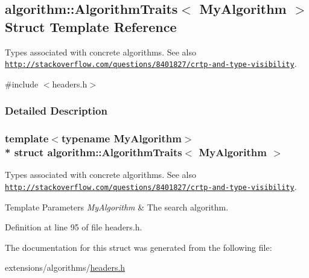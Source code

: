 \hypertarget{classalgorithm_1_1AlgorithmTraits}{}\subsection{algorithm\+:\+:Algorithm\+Traits$<$ My\+Algorithm $>$ Struct Template Reference}
\label{classalgorithm_1_1AlgorithmTraits}


Types associated with concrete algorithms. See also \href{http://stackoverflow.com/questions/8401827/crtp-and-type-visibility}{\tt http\+://stackoverflow.\+com/questions/8401827/crtp-\/and-\/type-\/visibility}.  




{\ttfamily \#include $<$headers.\+h$>$}



\subsubsection{Detailed Description}
\subsubsection*{template$<$typename My\+Algorithm$>$\\*
struct algorithm\+::\+Algorithm\+Traits$<$ My\+Algorithm $>$}

Types associated with concrete algorithms. See also \href{http://stackoverflow.com/questions/8401827/crtp-and-type-visibility}{\tt http\+://stackoverflow.\+com/questions/8401827/crtp-\/and-\/type-\/visibility}. 


\begin{DoxyTemplParams}{Template Parameters}
{\em My\+Algorithm} & The search algorithm. \\
\hline
\end{DoxyTemplParams}


Definition at line 95 of file headers.\+h.



The documentation for this struct was generated from the following file\+:\begin{DoxyCompactItemize}
\item 
extensions/algorithms/\hyperlink{extensions_2algorithms_2headers_8h}{headers.\+h}\end{DoxyCompactItemize}
